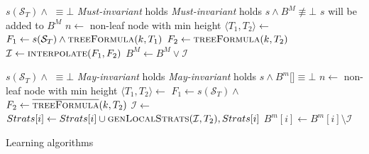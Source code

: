 \begin{algorithm}
    \begin{algorithmic}[1]
        \Require $s(\mathcal{S}_T) \land $  $\equiv \bot$
        \Require \emph{Must-invariant} holds
        \Ensure \emph{Must-invariant} holds
        \Ensure $s \land B^M \not\equiv \bot$
        \Comment $s$ will be added to $B^M$
                \Return
            \EndIIf
            \State $n \gets $ non-leaf node with min height 
            \State $\langle T_1, T_2 \rangle \gets $ 
            \State $F_1 \gets s(\mathcal{S}_T) \land \Call{treeFormula}{k, T_1}$
            \State $F_2 \gets \Call{treeFormula}{k, T_2}$
            \State $\mathcal{I} \gets  \Call{interpolate}{F_1, F_2}$
            \State $B^M \gets B^M \lor \mathcal{I}$
            \State {}
        \EndFunction
    \end{algorithmic}
    
    \begin{algorithmic}[1]
        \Require $s(\mathcal{S}_T) \land $  $\equiv \bot$
        \Require \emph{May-invariant} holds
        \Ensure \emph{May-invariant} holds
        \Ensure $s \land B^m[$$] \equiv \bot$
                \Return
            \EndIIf
            \State $n \gets $ non-leaf node with min height 
            \State $\langle T_1, T_2 \rangle \gets $ 
            \State $F_1 \gets s(\mathcal{S}_T) \land $ 
            \State $F_2 \gets \Call{\textoverline{treeFormula}}{k, T_2}$
            \State $\mathcal{I} \gets $ 
            \State $Strats[i] \gets Strats[i] \cup \Call{genLocalStrats}{\mathcal{I}, T_2}, Strats[i]$\label{line:cstrats}
            \EndFor
            \EndIf
                \State $B^m[i] \gets B^m[i] \setminus \mathcal{I}$
            \EndFor
            \State {}
        \EndFunction
    \end{algorithmic}
    \caption{Learning algorithms}
    \label{alg:learn}
\end{algorithm}

